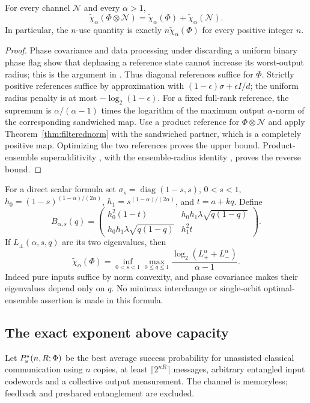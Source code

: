 \begin{corollary}\label{cor:renyiadd}
For every channel $\mathcal N$ and every $\alpha>1$,
\[
 \widetilde\chi_\alpha(\Phi\otimes\mathcal N)
 =\widetilde\chi_\alpha(\Phi)+\widetilde\chi_\alpha(\mathcal N).
\]
In particular, the $n$-use quantity is exactly
$n\widetilde\chi_\alpha(\Phi)$ for every positive integer $n$.
\end{corollary}
\begin{proof}
Phase covariance and data processing under discarding a uniform binary
phase flag show that dephasing a reference state cannot increase its
worst-output radius; this is the argument in \cite[Eq.~(37)]{fang}.
Thus diagonal references suffice for $\Phi$. Strictly positive references
suffice by approximation with $(1-\epsilon)\sigma+\epsilon I/d$;
the uniform radius penalty is at most $-\log_2(1-\epsilon)$.
For a fixed full-rank reference, the supremum is
$\alpha/(\alpha-1)$ times the logarithm of the maximum output
$\alpha$-norm of the corresponding sandwiched map.
Use a product reference for $\Phi\otimes\mathcal N$ and apply
Theorem~\ref{thm:filterednorm} with the sandwiched partner, which is a
completely positive map. Optimizing the two references proves the upper
bound. Product-ensemble superadditivity \cite{beigi}, with the
ensemble-radius identity \cite{mo}, proves the reverse bound.
\end{proof}

For a direct scalar formula set $\sigma_s=\operatorname{diag}(1-s,s)$,
$0<s<1$, $h_0=(1-s)^{(1-\alpha)/(2\alpha)}$,
$h_1=s^{(1-\alpha)/(2\alpha)}$, and $t=a+kq$. Define
\[
 B_{\alpha,s}(q)=\begin{pmatrix}
 h_0^2(1-t)&h_0h_1\lambda\sqrt{q(1-q)}\\
 h_0h_1\lambda\sqrt{q(1-q)}&h_1^2t
 \end{pmatrix}.
\]
If $L_\pm(\alpha,s,q)$ are its two eigenvalues, then
\begin{equation}\label{eq:renyiscalar}
 \widetilde\chi_\alpha(\Phi)=
 \inf_{0<s<1}\max_{0\le q\le1}
 \frac{\log_2(L_+^\alpha+L_-^\alpha)}{\alpha-1}.
\end{equation}
Indeed pure inputs suffice by norm convexity, and phase covariance
makes their eigenvalues depend only on $q$. No minimax interchange
or single-orbit optimal-ensemble assertion is made in this formula.

\subsection{The exact exponent above capacity}
Let $P_{\rm s}^{\star}(n,R;\Phi)$ be the best average success probability
for unassisted classical communication using $n$ copies, at least
$\lceil2^{nR}\rceil$ messages, arbitrary entangled input codewords and a
collective output measurement. The channel is memoryless; feedback and
preshared entanglement are excluded.

